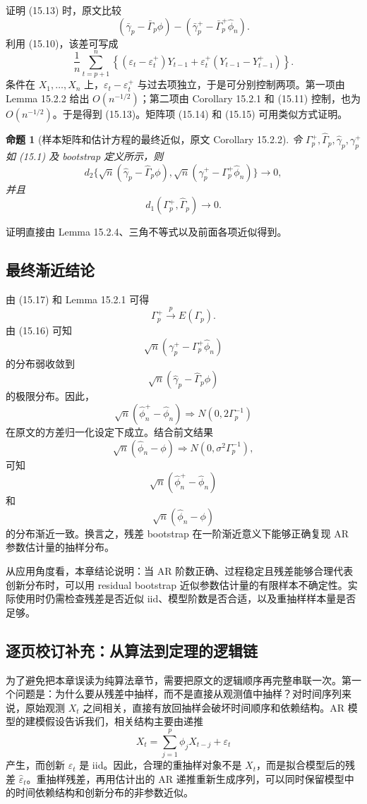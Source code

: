 \documentclass[11pt,a4paper]{ctexart}
\newtheorem{proposition}{命题}[section]
\begin{document}
证明 (15.13) 时，原文比较
\[
  (\bar\gamma_p-\bar\Gamma_p\phi)
  -(\bar\gamma_p^+-\bar\Gamma_p^+\hat\phi_n).
\]
利用 (15.10)，该差可写成
\[
  \frac1n\sum_{t=p+1}^n
  \left\{(\varepsilon_t-\varepsilon_t^+)Y_{t-1}
  +\varepsilon_t^+(Y_{t-1}-Y_{t-1}^+)\right\}.
\]
条件在 \(X_1,\ldots,X_n\) 上，\(\varepsilon_t-\varepsilon_t^+\) 与过去项独立，于是可分别控制两项。第一项由 Lemma 15.2.2 给出 \(O(n^{-1/2})\)；第二项由 Corollary 15.2.1 和 (15.11) 控制，也为 \(O(n^{-1/2})\)。于是得到 (15.13)。矩阵项 (15.14) 和 (15.15) 可用类似方式证明。

\begin{proposition}[样本矩阵和估计方程的最终近似，原文 Corollary 15.2.2]
令 \(\Gamma_p^+,\hat\Gamma_p,\hat\gamma_p,\gamma_p^+\) 如 (15.1) 及 bootstrap 定义所示，则
\[
  d_2\{\sqrt n(\hat\gamma_p-\hat\Gamma_p\phi),
        \sqrt n(\gamma_p^+-\Gamma_p^+\hat\phi_n)\}\to0,
  \tag{15.16}
\]
并且
\[
  d_1(\Gamma_p^+,\hat\Gamma_p)\to0.
  \tag{15.17}
\]
\end{proposition}

证明直接由 Lemma 15.2.4、三角不等式以及前面各项近似得到。

\subsection{最终渐近结论}

由 (15.17) 和 Lemma 15.2.1 可得
\[
  \Gamma_p^+\xrightarrow{p}E(\Gamma_p).
\]
由 (15.16) 可知
\[
  \sqrt n(\gamma_p^+-\Gamma_p^+\hat\phi_n)
\]
的分布弱收敛到
\[
  \sqrt n(\hat\gamma_p-\hat\Gamma_p\phi)
\]
的极限分布。因此，
\[
  \sqrt n(\hat\phi_n^+-\hat\phi_n)
  \Rightarrow N(0,2\Gamma_p^{-1})
\]
在原文的方差归一化设定下成立。结合前文结果
\[
  \sqrt n(\hat\phi_n-\phi)
  \Rightarrow N(0,\sigma^2\Gamma_p^{-1}),
\]
可知
\[
  \sqrt n(\hat\phi_n^+-\hat\phi_n)
\]
和
\[
  \sqrt n(\hat\phi_n-\phi)
\]
的分布渐近一致。换言之，残差 bootstrap 在一阶渐近意义下能够正确复现 AR 参数估计量的抽样分布。

从应用角度看，本章结论说明：当 AR 阶数正确、过程稳定且残差能够合理代表创新分布时，可以用 residual bootstrap 近似参数估计量的有限样本不确定性。实际使用时仍需检查残差是否近似 iid、模型阶数是否合适，以及重抽样样本量是否足够。

\subsection{逐页校订补充：从算法到定理的逻辑链}

为了避免把本章误读为纯算法章节，需要把原文的逻辑顺序再完整串联一次。第一个问题是：为什么要从残差中抽样，而不是直接从观测值中抽样？对时间序列来说，原始观测 \(X_t\) 之间相关，直接有放回抽样会破坏时间顺序和依赖结构。AR 模型的建模假设告诉我们，相关结构主要由递推
\[
  X_t=\sum_{j=1}^p\phi_jX_{t-j}+\varepsilon_t
\]
产生，而创新 \(\varepsilon_t\) 是 iid。因此，合理的重抽样对象不是 \(X_t\)，而是拟合模型后的残差 \(\hat\varepsilon_t\)。重抽样残差，再用估计出的 AR 递推重新生成序列，可以同时保留模型中的时间依赖结构和创新分布的非参数近似。
\end{document}
